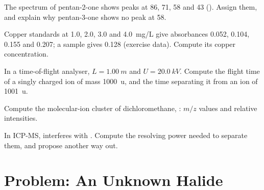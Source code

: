 \begin{exercise}[$\star\star$]\label{exo:b2:mass-spec-atomic:8}
The spectrum of pentan-2-one shows peaks at 86, 71, 58 and 43 (). Assign them, and explain
why pentan-3-one shows no peak at 58.
\end{exercise}

\begin{exercise}[$\star\star$]\label{exo:b2:mass-spec-atomic:9}
Copper standards at 1.0, 2.0, 3.0 and \qty{4.0}{mg/L} give absorbances 0.052, 0.104, 0.155 and 0.207;
a sample gives 0.128 (exercise data). Compute its copper concentration.
\end{exercise}

\begin{exercise}[$\star\star\star$]\label{exo:b2:mass-spec-atomic:10}
In a time-of-flight analyser, $L = \qty{1.00}{m}$ and $U = \qty{20.0}{kV}$. Compute the flight time of
a singly charged ion of mass \qty{1000}{u}, and the time separating it from an ion of \qty{1001}{u}.
\end{exercise}

\begin{exercise}[$\star\star\star$]\label{exo:b2:mass-spec-atomic:11}
Compute the molecular-ion cluster of dichloromethane, : $m/z$ values and relative
intensities.
\end{exercise}

\begin{exercise}[$\star\star\star$]\label{exo:b2:mass-spec-atomic:12}
In ICP-MS,  interferes with . Compute the resolving power needed to
separate them, and propose another way out.
\end{exercise}

\section{Problem: An Unknown Halide}

